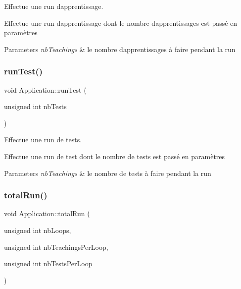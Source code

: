Effectue une run d\textquotesingle{}apprentissage. 

Effectue une run d\textquotesingle{}apprentissage dont le nombre d\textquotesingle{}apprentissages est passé en paramètres 
\begin{DoxyParams}{Parameters}
{\em nb\+Teachings} & le nombre d\textquotesingle{}apprentissages à faire pendant la run \\
\hline
\end{DoxyParams}
\mbox{\label{classApplication_a2efd3cc253a127ea682a00b560f6d073}} 
\subsubsection{\texorpdfstring{run\+Test()}{runTest()}}
{\footnotesize\ttfamily void Application\+::run\+Test (\begin{DoxyParamCaption}\item[{unsigned int}]{nb\+Tests }\end{DoxyParamCaption})}



Effectue une run de tests. 

Effectue une run de test dont le nombre de tests est passé en paramètres 
\begin{DoxyParams}{Parameters}
{\em nb\+Teachings} & le nombre de tests à faire pendant la run \\
\hline
\end{DoxyParams}
\mbox{\label{classApplication_a105d173f14e444ddb485d5ac5df91d74}} 
\subsubsection{\texorpdfstring{total\+Run()}{totalRun()}}
{\footnotesize\ttfamily void Application\+::total\+Run (\begin{DoxyParamCaption}\item[{unsigned int}]{nb\+Loops,  }\item[{unsigned int}]{nb\+Teachings\+Per\+Loop,  }\item[{unsigned int}]{nb\+Tests\+Per\+Loop }\end{DoxyParamCaption})}



